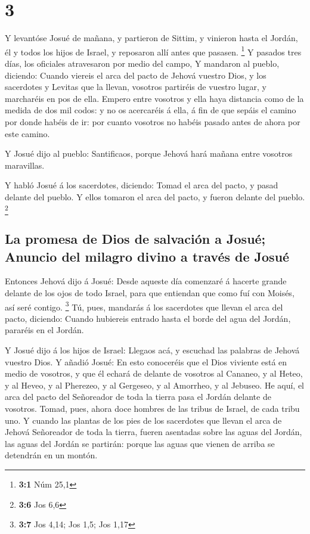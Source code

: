 \hypertarget{section-2}{%
\section{3}\label{section-2}}

 Y levantóse Josué de mañana, y partieron de Sittim, y
vinieron hasta el Jordán, él y todos los hijos de Israel, y reposaron
allí antes que pasasen. \footnote{\textbf{3:1} Núm 25,1} 
Y pasados tres días, los oficiales atravesaron por medio del campo,
 Y mandaron al pueblo, diciendo: Cuando viereis el arca
del pacto de Jehová vuestro Dios, y los sacerdotes y Levitas que la
llevan, vosotros partiréis de vuestro lugar, y marcharéis en pos de
ella.  Empero entre vosotros y ella haya distancia como de
la medida de dos mil codos: y no os acercaréis á ella, á fin de que
sepáis el camino por donde habéis de ir: por cuanto vosotros no habéis
pasado antes de ahora por este camino.

 Y Josué dijo al pueblo: Santificaos, porque Jehová hará
mañana entre vosotros maravillas.

 Y habló Josué á los sacerdotes, diciendo: Tomad el arca
del pacto, y pasad delante del pueblo. Y ellos tomaron el arca del
pacto, y fueron delante del pueblo. \footnote{\textbf{3:6} Jos 6,6}

\hypertarget{la-promesa-de-dios-de-salvaciuxf3n-a-josuuxe9-anuncio-del-milagro-divino-a-travuxe9s-de-josuuxe9}{%
\subsection{La promesa de Dios de salvación a Josué; Anuncio del milagro
divino a través de
Josué}\label{la-promesa-de-dios-de-salvaciuxf3n-a-josuuxe9-anuncio-del-milagro-divino-a-travuxe9s-de-josuuxe9}}

 Entonces Jehová dijo á Josué: Desde aqueste día comenzaré
á hacerte grande delante de los ojos de todo Israel, para que entiendan
que como fuí con Moisés, así seré contigo. \footnote{\textbf{3:7} Jos
  4,14; Jos 1,5; Jos 1,17}  Tú, pues, mandarás á los
sacerdotes que llevan el arca del pacto, diciendo: Cuando hubiereis
entrado hasta el borde del agua del Jordán, pararéis en el Jordán.

 Y Josué dijo á los hijos de Israel: Llegaos acá, y
escuchad las palabras de Jehová vuestro Dios.  Y añadió
Josué: En esto conoceréis que el Dios viviente está en medio de
vosotros, y que él echará de delante de vosotros al Cananeo, y al Heteo,
y al Heveo, y al Pherezeo, y al Gergeseo, y al Amorrheo, y al Jebuseo.
 He aquí, el arca del pacto del Señoreador de toda la
tierra pasa el Jordán delante de vosotros.  Tomad, pues,
ahora doce hombres de las tribus de Israel, de cada tribu uno.
 Y cuando las plantas de los pies de los sacerdotes que
llevan el arca de Jehová Señoreador de toda la tierra, fueren asentadas
sobre las aguas del Jordán, las aguas del Jordán se partirán: porque las
aguas que vienen de arriba se detendrán en un montón.

